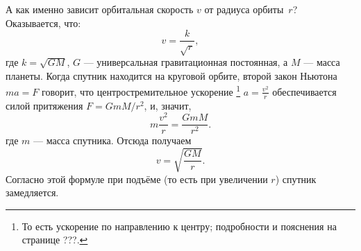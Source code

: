 А как именно зависит орбитальная скорость \(v\) от радиуса орбиты~\(r\)?
Оказывается, что:
\[
v = \frac{k}{\sqrt{r}},
\]
где \(k = \sqrt{GM}\),
\(G\) — универсальная гравитационная постоянная,
а \(M\) — масса планеты.
Когда спутник находится на круговой орбите, второй закон Ньютона \(ma = F\) говорит, что центростремительное ускорение%
\footnote{То есть ускорение по направлению к центру; подробности и пояснения на странице ???.}
$a = \frac{v^2}{r}$ обеспечивается силой притяжения $F = {GmM}/{r^2}$, и, значит,
\[
m \frac{v^2}{r} = \frac{GmM}{r^2}.
\]
где \(m\) — масса спутника. Отсюда получаем
\[
v = \sqrt{\frac{GM}{r}}.
\]
Согласно этой формуле при подъёме (то есть при увеличении \(r\)) спутник замедляется.
